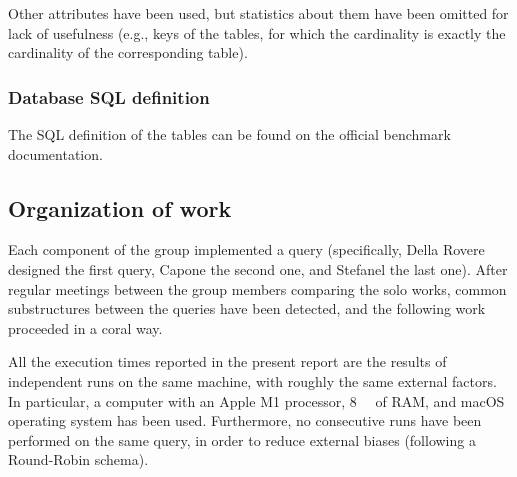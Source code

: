 Other attributes have been used, but statistics about them have been omitted for lack of usefulness (e.g., keys of the tables, for which the cardinality is exactly the cardinality of the corresponding table).

\subsubsection{Database SQL definition}

The SQL definition of the tables can be found on the official benchmark documentation\cite{TPC-H}.

\subsection{Organization of work}
\label{subsection:organizationwork}

Each component of the group implemented a query (specifically, Della Rovere designed the first query, Capone the second one, and Stefanel the last one).
After regular meetings between the group members comparing the solo works, common substructures between the queries have been detected, and the following work proceeded in a coral way.

All the execution times reported in the present report are the results of independent runs on the same machine, with roughly the same external factors. In particular, a computer with an Apple M1 processor, \SI{8}{\giga\byte} of RAM, and macOS operating system has been used.
Furthermore, no consecutive runs have been performed on the same query, in order to reduce external biases (following a Round-Robin schema).